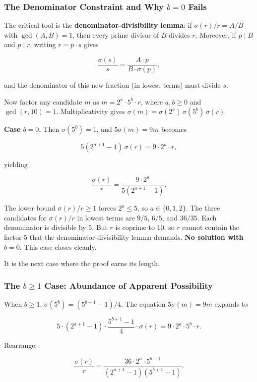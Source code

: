 \documentclass[12pt,a4paper]{article}
\begin{document}
    \subsubsection{The Denominator Constraint and Why $b = 0$ Fails}

    The critical tool is the \textbf{denominator-divisibility lemma}: if $\sigma(r)/r = A/B$ with $\gcd(A,B) = 1$, then every prime divisor of $B$ divides $r$. Moreover, if $p \mid B$ and $p \mid r$, writing $r = p \cdot s$ gives

    \[\frac{\sigma(s)}{s} = \frac{A \cdot p}{B \cdot \sigma(p)},\]

    and the denominator of this new fraction (in lowest terms) must divide $s$.

    Now factor any candidate $m$ as $m = 2^a \cdot 5^b \cdot r$, where $a,b \ge 0$ and $\gcd(r,10) = 1$. Multiplicativity gives $\sigma(m) = \sigma(2^a)\,\sigma(5^b)\,\sigma(r)$.

    \textbf{Case $b = 0$.} Then $\sigma(5^0) = 1$, and $5\sigma(m) = 9m$ becomes

    \[5(2^{a+1} - 1)\,\sigma(r) = 9 \cdot 2^a \cdot r,\]

    yielding

    \[\frac{\sigma(r)}{r} = \frac{9 \cdot 2^a}{5(2^{a+1} - 1)}.\]

    The lower bound $\sigma(r)/r \ge 1$ forces $2^a \le 5$, so $a \in \{0,1,2\}$. The three candidates for $\sigma(r)/r$ in lowest terms are $9/5$, $6/5$, and $36/35$. Each denominator is divisible by $5$. But $r$ is coprime to $10$, so $r$ cannot contain the factor $5$ that the denominator-divisibility lemma demands. \textbf{No solution with $b = 0$.} This case closes cleanly.

    It is the next case where the proof earns its length.

    \subsubsection{The $b \ge 1$ Case: Abundance of Apparent Possibility}

    When $b \ge 1$, $\sigma(5^b) = (5^{b+1} - 1)/4$. The equation $5\sigma(m) = 9m$ expands to

    \[5 \cdot (2^{a+1} - 1) \cdot \frac{5^{b+1} - 1}{4} \cdot \sigma(r) = 9 \cdot 2^a \cdot 5^b \cdot r.\]

    Rearrange:

    \[\frac{\sigma(r)}{r} = \frac{36 \cdot 2^a \cdot 5^{b-1}}{(2^{a+1} - 1)(5^{b+1} - 1)}. \tag{1}\]
\end{document}
